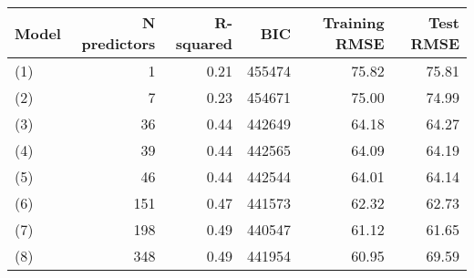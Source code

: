 \begin{tabular}{lrrrrr}
  \toprule
Model & N predictors & R-squared & BIC & Training RMSE & Test RMSE \\ 
  \midrule
(1) & 1 & 0.21 & 455474 & 75.82 & 75.81 \\ 
  (2) & 7 & 0.23 & 454671 & 75.00 & 74.99 \\ 
  (3) & 36 & 0.44 & 442649 & 64.18 & 64.27 \\ 
  (4) & 39 & 0.44 & 442565 & 64.09 & 64.19 \\ 
  (5) & 46 & 0.44 & 442544 & 64.01 & 64.14 \\ 
  (6) & 151 & 0.47 & 441573 & 62.32 & 62.73 \\ 
  (7) & 198 & 0.49 & 440547 & 61.12 & 61.65 \\ 
  (8) & 348 & 0.49 & 441954 & 60.95 & 69.59 \\ 
   \bottomrule
\end{tabular}
